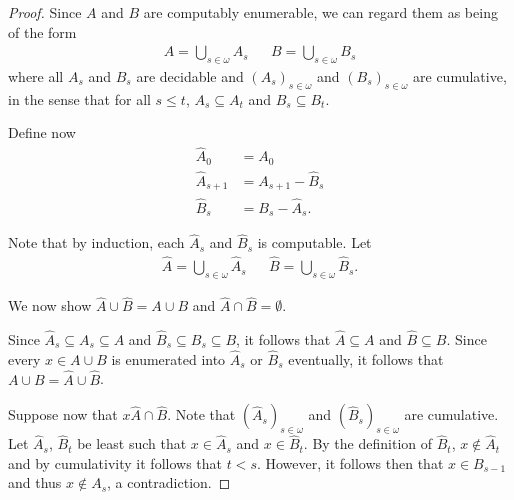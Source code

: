 \documentclass{article}
\begin{document}
  \begin{proof}
    Since $A$ and $B$ are computably enumerable, we can regard them as being of the form
    \begin{align*}
      A = \bigcup_{s \in \omega} A_s && B = \bigcup_{s \in \omega} B_s
    \end{align*}
    where all $A_s$ and $B_s$ are decidable and $(A_s)_{s \in \omega}$ and $(B_s)_{s \in \omega}$ are
    cumulative, in the sense that for all $s \le t$, $A_s \subseteq A_t$ and $B_s \subseteq B_t$.

    Define now
    \begin{align*}
      \hat A_0 &= A_0\\
      \hat A_{s+1} &= A_{s+1} - \hat B_s\\
      \hat B_s &= B_s - \hat A_s.
    \end{align*}

    Note that by induction, each $\hat A_s$ and $\hat B_s$ is computable.  Let
    \begin{align*}
      \hat A = \bigcup_{s \in \omega} \hat A_s && \hat B = \bigcup_{s \in \omega} \hat B_s.
    \end{align*}

    We now show $\hat A \cup \hat B = A \cup B$ and $\hat A \cap \hat B = \emptyset$.

    Since $\hat A_s \subseteq A_s \subseteq A$ and $\hat B_s \subseteq B_s \subseteq B$, it
    follows that $\hat A \subseteq A$ and $\hat B \subseteq B$.  Since every $x \in A \cup B$ is enumerated into $\hat A_s$ or
    $\hat B_s$ eventually, it follows that $A \cup B = \hat A \cup \hat B$.

    Suppose now that $x \hat A \cap \hat B$. Note that
    $(\hat A_s)_{s \in \omega}$ and $(\hat B_s)_{s \in \omega}$ are cumulative. 
     Let $\hat A_s$, $\hat B_t$ be least such that
    $x \in \hat A_s$ and $x \in \hat B_t$.  By the definition of $\hat B_t$,
    $x \not \in \hat A_t$ and by cumulativity it follows that $t < s$.  However, it follows
    then that $x \in B_{s-1}$ and thus $x \not \in A_s$, a contradiction.
  \end{proof}
\end{document}
